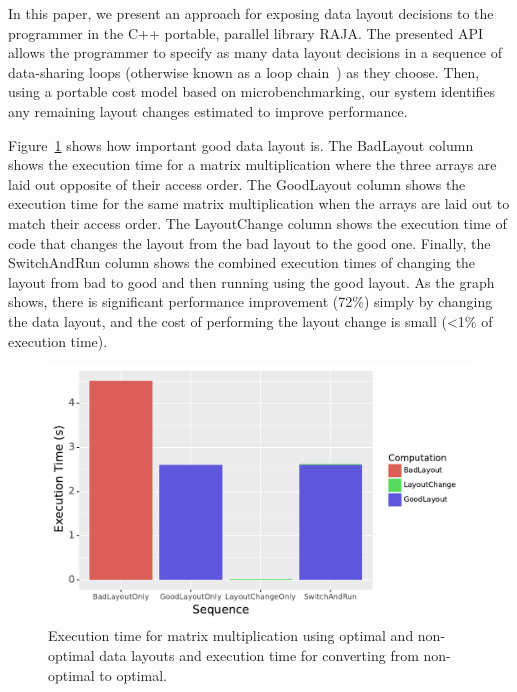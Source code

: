 \documentclass[sigconf]{acmart}
\begin{document}
In this paper, we present an approach for exposing data layout decisions to the programmer in the C++ portable, parallel library RAJA.
The presented API allows the programmer to specify as many data layout decisions in a sequence of data-sharing loops (otherwise known as a loop chain~\cite{krieger2013loop}) as they choose.
Then, using a portable cost model based on microbenchmarking, our system identifies any remaining layout changes estimated to improve performance.  


Figure~\ref{IntroExample} shows how important good data layout is. 
The BadLayout column shows the execution time for a matrix multiplication where the three arrays are laid out opposite of their access order. 
The GoodLayout column shows the execution time for the same matrix multiplication when the arrays are laid out to match their access order.
The LayoutChange column shows the execution time of code that changes the layout from the bad layout to the good one.
Finally, the SwitchAndRun column shows the combined execution times of changing the layout from bad to good and then running using the good layout.
As the graph shows, there is significant performance improvement (72\%) simply by changing the data layout, and the cost of performing the layout change is small (<1\% of execution time). 

\begin{figure}
	\includegraphics[width=\columnwidth]{IntroExampleGraph.pdf}
	\caption{Execution time for matrix multiplication using optimal and non-optimal data layouts and execution time for converting from non-optimal to optimal.}
	\label{IntroExample}
\end{figure}
\end{document}

